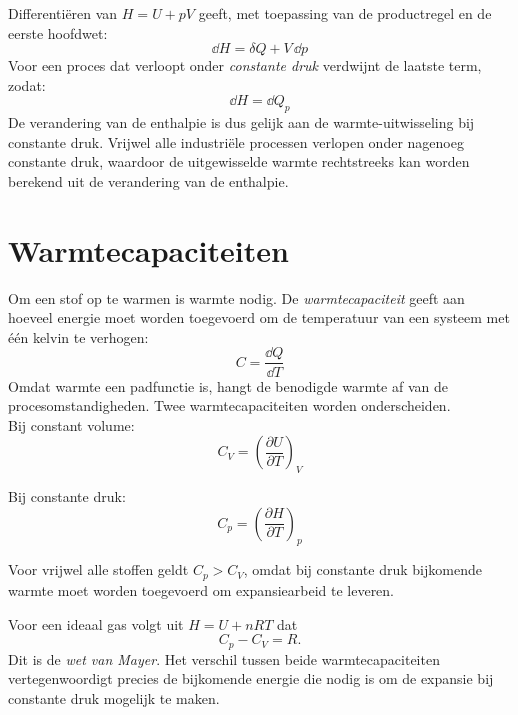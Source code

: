 Differenti\"eren van $H = U + pV$ geeft, met toepassing van de productregel en de eerste hoofdwet:
\begin{equation}
\dd H = \delta Q + V\,\dd p
\end{equation}
Voor een proces dat verloopt onder \emph{constante druk} verdwijnt de laatste term, zodat:
\begin{equation}
\dd H = \dd Q_p
\end{equation}
De verandering van de enthalpie is dus gelijk aan de warmte-uitwisseling bij constante druk. Vrijwel alle industri\"ele processen verlopen onder nagenoeg constante druk, waardoor de uitgewisselde warmte rechtstreeks kan worden berekend uit de verandering van de enthalpie.

\section{Warmtecapaciteiten}
\label{sec:warmtecapaciteiten}

Om een stof op te warmen is warmte nodig. De \emph{warmtecapaciteit} geeft aan hoeveel energie moet worden toegevoerd om de temperatuur van een systeem met \'e\'en kelvin te verhogen:
\begin{equation}
C = \frac{\dd Q}{\dd T}
\end{equation}
Omdat warmte een padfunctie is, hangt de benodigde warmte af van de procesomstandigheden. Twee warmtecapaciteiten worden onderscheiden.\\

Bij constant volume:
\begin{equation}
C_V = \left(\frac{\partial U}{\partial T}\right)_V
\end{equation}

Bij constante druk:
\begin{equation}
C_p = \left(\frac{\partial H}{\partial T}\right)_p
\end{equation}

Voor vrijwel alle stoffen geldt $C_p > C_V$, omdat bij constante druk bijkomende warmte moet worden toegevoerd om expansiearbeid te leveren.

Voor een ideaal gas volgt uit $H = U + nRT$ dat
\begin{equation}
C_p - C_V = R.
\end{equation}
Dit is de \emph{wet van Mayer}. Het verschil tussen beide warmtecapaciteiten vertegenwoordigt precies de bijkomende energie die nodig is om de expansie bij constante druk mogelijk te maken.

